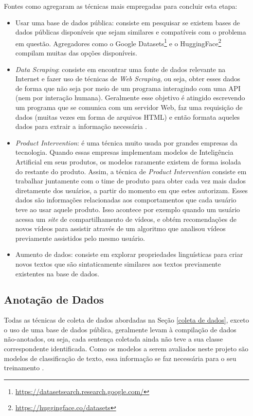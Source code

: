 Fontes como \cite{practical_nlp} agregaram as técnicas mais empregadas para concluir esta etapa:
\begin{itemize}
    \item Usar uma base de dados pública: consiste em pesquisar se existem bases de dados públicas disponíveis que sejam similares e compatíveis com o problema em questão. Agregadores como o Google Datasets\footnote{\url{https://datasetsearch.research.google.com/}} e o HuggingFace\footnote{\url{https://huggingface.co/datasets}} compilam muitas das opções disponíveis.
    
    \item \textit{Data Scraping}: consiste em encontrar uma fonte de dados relevante na Internet e fazer uso de técnicas de \textit{Web Scraping}, ou seja, obter esses dados de forma que não seja por meio de um programa interagindo com uma API (nem por interação humana). Geralmente esse objetivo é atingido escrevendo um programa que se comunica com um servidor Web, faz uma requisição de dados (muitas vezes em forma de arquivos HTML) e então formata aqueles dados para extrair a informação necessária \cite{web_scaping}.
    \item \textit{Product Intervention}: é uma técnica muito usada por grandes empresas da tecnologia. Quando essas empresas implementam modelos de Inteligência Artificial em seus produtos, os modelos raramente existem de forma isolada do restante do produto. Assim, a técnica de \textit{Product Intervention} consiste em trabalhar juntamente com o time de produto para obter cada vez mais dados diretamente dos usuários, a partir do momento em que estes autorizam. Esses dados são informações relacionadas aos comportamentos que cada usuário teve ao usar aquele produto. Isso acontece por exemplo quando um usuário acessa um \textit{site} de compartilhamento de vídeos, e obtém recomendações de novos vídeos para assistir através de um algoritmo que analisou vídeos previamente assistidos pelo mesmo usuário.
    \item Aumento de dados: consiste em explorar propriedades linguísticas para criar novos textos que são sintaticamente similares aos textos previamente existentes na base de dados.
\end{itemize}


\subsection{Anotação de Dados}
Todas as técnicas de coleta de dados abordadas na Seção \ref{coleta de dados}, exceto o uso de uma base de dados pública, geralmente levam à compilação de dados não-anotados, ou seja, cada sentença coletada ainda não teve a sua classe correspondente identificada. Como os modelos a serem avaliados neste projeto são modelos de classificação de texto, essa informação se faz necessária para o seu treinamento \cite{survey}.

